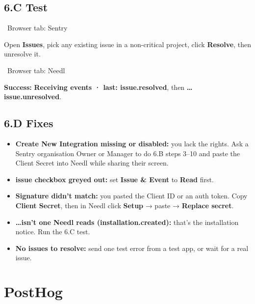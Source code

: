 \documentclass[11pt,a4paper]{article}
\newcommand{\ui}[1]{\textbf{#1}}
\newcommand{\where}[1]{\par\smallskip\noindent\colorbox{winbg}{\color{winfg}\bfseries\strut\ #1\ }\par\nopagebreak[4]}
\begin{document}
\subsection*{6.C Test}
\where{Browser tab: Sentry}
Open \ui{Issues}, pick any existing issue in a non-critical project, click \ui{Resolve}, then unresolve it.
\where{Browser tab: Needl}
\textbf{Success:} \ui{Receiving events · last: issue.resolved}, then \ui{… issue.unresolved}.

\subsection*{6.D Fixes}
\begin{itemize}
\item \textbf{\ui{Create New Integration} missing or disabled:} you lack the rights. Ask a Sentry organisation Owner or Manager to do 6.B steps 3–10 and paste the Client Secret into Needl while sharing their screen.
\item \textbf{\ui{issue} checkbox greyed out:} set \ui{Issue \& Event} to \ui{Read} first.
\item \textbf{Signature didn't match:} you pasted the Client ID or an auth token. Copy \ui{Client Secret}, then in Needl click \ui{Setup} → paste → \ui{Replace secret}.
\item \textbf{\ui{…isn't one Needl reads (installation.created)}:} that's the installation notice. Run the 6.C test.
\item \textbf{No issues to resolve:} send one test error from a test app, or wait for a real issue.
\end{itemize}

\clearpage
\section{PostHog}
\end{document}
